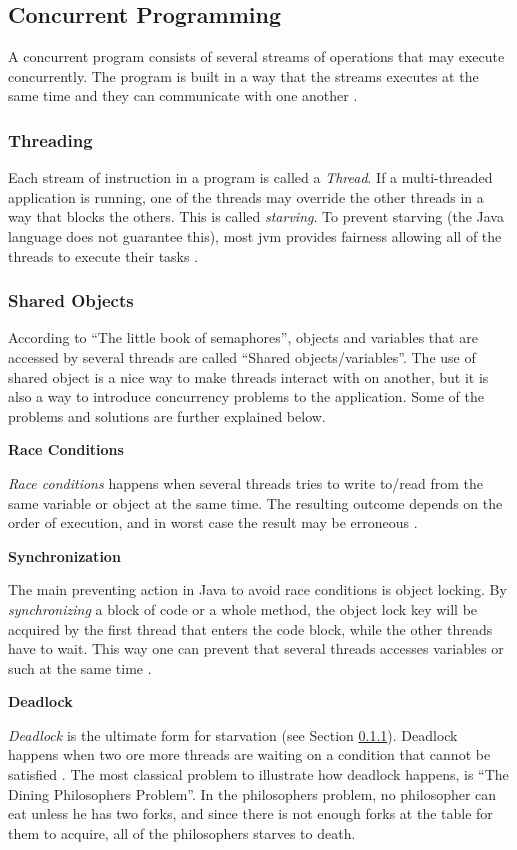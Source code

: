\subsection{Concurrent Programming}
\label{sec:concurrentprog}
A concurrent program consists of several streams of operations that may execute concurrently. The program is built in a way that the streams executes at the same time and they can communicate with one another \cite{cartwright2000}.

\subsubsection{Threading}
\label{sec:threading}
Each stream of instruction in a program is called a \textit{Thread}. If a multi-threaded application is running, one of the threads may override the other threads in a way that blocks the others. This is called \textit{starving}. To prevent starving (the Java language does not guarantee this), most \acrshort{jvm} provides fairness allowing all of the threads to execute their tasks \cite{cartwright2000}.

\subsubsection{Shared Objects}
\label{sec:sharedobj}
According to ``The little book of semaphores''\cite{downey2008}, objects and variables that are accessed by several threads are called ``Shared objects/variables''. The use of shared object is a nice way to make threads interact with on another, but it is also a way to introduce concurrency problems to the application. Some of the problems and solutions are further explained below.

\textbf{Race Conditions}
\label{sec:raisedcond}

\textit{Race conditions} happens when several threads tries to write to/read from the same variable or object at the same time. The resulting outcome depends on the order of execution, and in worst case the result may be erroneous \cite{stevecarr2003}. 

\textbf{Synchronization}
\label{sec:synchronization}

The main preventing action in Java to avoid race conditions is object locking. By \textit{synchronizing} a block of code or a whole method, the object lock key will be acquired by the first thread that enters the code block, while the other threads have to wait. This way one can prevent that several threads accesses variables or such at the same time \cite{cartwright2000}.

\textbf{Deadlock}
\label{sec:deadlock}

\textit{Deadlock} is the ultimate form for starvation (see Section \ref{sec:threading}). Deadlock happens when two ore more threads are waiting on a condition that cannot be satisfied \cite{sunmicrosystems2005}. The most classical problem to illustrate how deadlock happens, is ``The Dining Philosophers Problem''\cite{cartwright2000v2}. In the philosophers problem, no philosopher can eat unless he has two forks, and since there is not enough forks at the table for them to acquire, all of the philosophers starves to death.